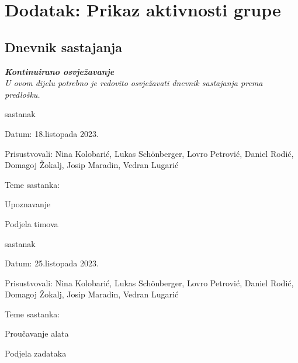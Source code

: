 \chapter*{Dodatak: Prikaz aktivnosti grupe}
		
		\section*{Dnevnik sastajanja}
		
		\textbf{\textit{Kontinuirano osvježavanje}}\\
		
		 \textit{U ovom dijelu potrebno je redovito osvježavati dnevnik sastajanja prema predlošku.}
		
		\begin{packed_enum}
			\item  sastanak
			
			\item[] \begin{packed_item}
				\item Datum: 18.listopada 2023.
				\item Prisustvovali: Nina Kolobarić, Lukas Schönberger, Lovro Petrović, Daniel Rodić, Domagoj Žokalj, Josip Maradin, Vedran Lugarić
				\item Teme sastanka:
				\begin{packed_item}
					\item  Upoznavanje
					\item  Podjela timova
				\end{packed_item}
			\end{packed_item}
			
			\item  sastanak
			\item[] \begin{packed_item}
				\item Datum: 25.listopada 2023.
				\item Prisustvovali: Nina Kolobarić, Lukas Schönberger, Lovro Petrović, Daniel Rodić, Domagoj Žokalj, Josip Maradin, Vedran Lugarić
				\item Teme sastanka:
				\begin{packed_item}
					\item  Proučavanje alata
					\item  Podjela zadataka
				\end{packed_item}
			\end{packed_item}
			

\end{packed_enum}
